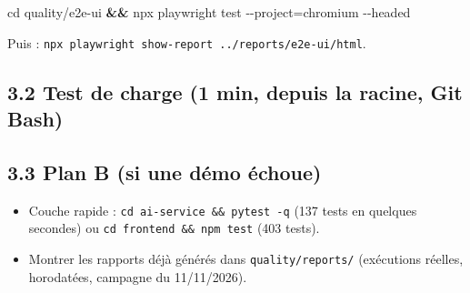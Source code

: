 \documentclass[
  11pt,
]{article}
\newenvironment{Shaded}{}{}
\newcommand{\AttributeTok}[1]{\textcolor[rgb]{0.49,0.56,0.16}{#1}}
\newcommand{\BuiltInTok}[1]{\textcolor[rgb]{0.00,0.50,0.00}{#1}}
\newcommand{\DecValTok}[1]{\textcolor[rgb]{0.25,0.63,0.44}{#1}}
\newcommand{\ExtensionTok}[1]{#1}
\newcommand{\KeywordTok}[1]{\textcolor[rgb]{0.00,0.44,0.13}{\textbf{#1}}}
\newcommand{\NormalTok}[1]{#1}
\newcommand{\OperatorTok}[1]{\textcolor[rgb]{0.40,0.40,0.40}{#1}}
\newcommand{\StringTok}[1]{\textcolor[rgb]{0.25,0.44,0.63}{#1}}
\newcommand{\VariableTok}[1]{\textcolor[rgb]{0.10,0.09,0.49}{#1}}
\providecommand{\tightlist}{%
  \setlength{\itemsep}{0pt}\setlength{\parskip}{0pt}}
\begin{document}
\begin{Shaded}
\begin{Highlighting}[]
\BuiltInTok{cd}\NormalTok{ quality/e2e{-}ui }\KeywordTok{\&\&} \ExtensionTok{npx}\NormalTok{ playwright test }\AttributeTok{{-}{-}project}\OperatorTok{=}\NormalTok{chromium }\AttributeTok{{-}{-}headed}
\end{Highlighting}
\end{Shaded}

Puis :
\texttt{npx\ playwright\ show-}\allowbreak{}\texttt{report\ .}\allowbreak{}\texttt{.}\allowbreak{}\texttt{/}\allowbreak{}\texttt{reports/}\allowbreak{}\texttt{e2e-}\allowbreak{}\texttt{ui/}\allowbreak{}\texttt{html}.

\subsection{3.2 Test de charge (1 min, depuis la racine, Git
Bash)}\label{32-test-de-charge-1-min-depuis-la-racine-git-bash}

\begin{Shaded}
\end{Shaded}

\subsection{3.3 Plan B (si une démo
échoue)}\label{33-plan-b-si-une-duxe9mo-uxe9choue}

\begin{itemize}
\tightlist
\item
  Couche rapide :
  \texttt{cd\ ai-}\allowbreak{}\texttt{service\ \&\&\ pytest\ -}\allowbreak{}\texttt{q}
  (137 tests en quelques secondes) ou
  \texttt{cd\ frontend\ \&\&\ npm\ test} (403 tests).
\item
  Montrer les rapports déjà générés dans \texttt{quality/reports/}
  (exécutions réelles, horodatées, campagne du 11/11/2026).
\end{itemize}
\end{document}
